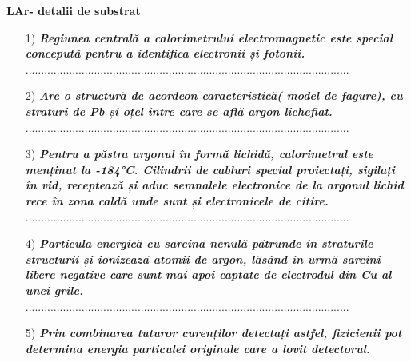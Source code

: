 \documentclass{beamer}
\begin{document}
\begin{frame}{\textbf{LAr- detalii de substrat}}

\vspace{-0.5cm}

\begin{itemize}
 \small
    \item[1)] \makebox[0.5cm]{}  \textit{\textbf{Regiunea centrală a calorimetrului electromagnetic este special concepută pentru a identifica electronii și fotonii.}} \\

    ........................................................................................................
    
    \item[2)] \makebox[0.5cm]{}  \textit{\textbf{Are o structură de acordeon caracteristică( model de fagure), cu straturi de Pb și oțel între care se află argon lichefiat.}}\\

    ........................................................................................................

    \item[3)] \makebox[0.5cm]{}  \textit{\textbf{Pentru a păstra argonul în formă lichidă, calorimetrul este menținut la -184°C. Cilindrii de cabluri special proiectați, sigilați în vid, receptează și aduc semnalele electronice de la argonul lichid rece în zona caldă unde sunt și electronicele de citire.}}\\

    ........................................................................................................

    \item[4)] \makebox[0.5cm]{}  \textit{\textbf{Particula energică cu sarcină nenulă pătrunde în straturile structurii și ionizează atomii de argon, lăsând în urmă sarcini libere negative care sunt mai apoi captate de electrodul din Cu al unei grile.}}\\

    ........................................................................................................

    \item[5)] \makebox[0.5cm]{}  \textit{\textbf{Prin combinarea tuturor curenților detectați astfel, fizicienii pot determina energia particulei originale care a lovit detectorul.}}
    
\end{itemize}

\end{frame}
\end{document}
